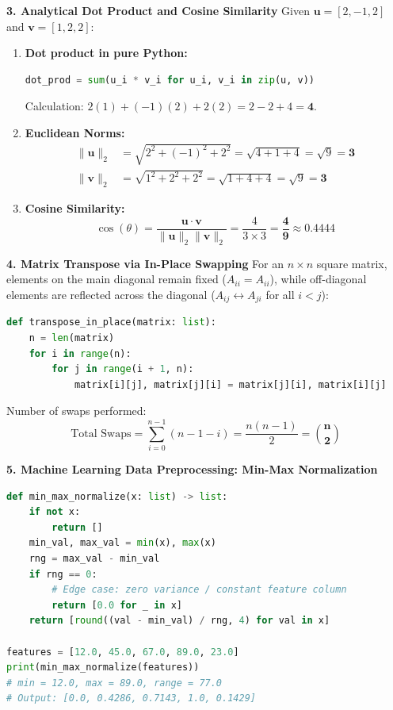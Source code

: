 \textbf{3. Analytical Dot Product and Cosine Similarity}
Given $\mathbf{u} = [2, -1, 2]$ and $\mathbf{v} = [1, 2, 2]$:
\begin{enumerate}
    \item \textbf{Dot product in pure Python:}
    \begin{lstlisting}[language=Python]
    dot_prod = sum(u_i * v_i for u_i, v_i in zip(u, v))
    \end{lstlisting}
    Calculation: $2(1) + (-1)(2) + 2(2) = 2 - 2 + 4 = \mathbf{4}$.
    \item \textbf{Euclidean Norms:}
    \begin{align*}
    \|\mathbf{u}\|_2 &= \sqrt{2^2 + (-1)^2 + 2^2} = \sqrt{4 + 1 + 4} = \sqrt{9} = \mathbf{3} \\
    \|\mathbf{v}\|_2 &= \sqrt{1^2 + 2^2 + 2^2} = \sqrt{1 + 4 + 4} = \sqrt{9} = \mathbf{3}
    \end{align*}
    \item \textbf{Cosine Similarity:}
    \begin{equation*}
    \cos(\theta) = \frac{\mathbf{u} \cdot \mathbf{v}}{\|\mathbf{u}\|_2 \|\mathbf{v}\|_2} = \frac{4}{3 \times 3} = \mathbf{\frac{4}{9}} \approx \mathbf{0.4444}
    \end{equation*}
\end{enumerate}

\textbf{4. Matrix Transpose via In-Place Swapping}
For an $n \times n$ square matrix, elements on the main diagonal remain fixed ($A_{ii} = A_{ii}$), while off-diagonal elements are reflected across the diagonal ($A_{ij} \leftrightarrow A_{ji}$ for all $i < j$):
\begin{lstlisting}[language=Python]
def transpose_in_place(matrix: list):
    n = len(matrix)
    for i in range(n):
        for j in range(i + 1, n):
            matrix[i][j], matrix[j][i] = matrix[j][i], matrix[i][j]
\end{lstlisting}
Number of swaps performed:
\begin{equation*}
\text{Total Swaps} = \sum_{i=0}^{n-1} (n - 1 - i) = \frac{n(n - 1)}{2} = \mathbf{\binom{n}{2}}
\end{equation*}

\textbf{5. Machine Learning Data Preprocessing: Min-Max Normalization}
\begin{lstlisting}[language=Python]
def min_max_normalize(x: list) -> list:
    if not x:
        return []
    min_val, max_val = min(x), max(x)
    rng = max_val - min_val
    if rng == 0:
        # Edge case: zero variance / constant feature column
        return [0.0 for _ in x]
    return [round((val - min_val) / rng, 4) for val in x]

features = [12.0, 45.0, 67.0, 89.0, 23.0]
print(min_max_normalize(features))
# min = 12.0, max = 89.0, range = 77.0
# Output: [0.0, 0.4286, 0.7143, 1.0, 0.1429]
\end{lstlisting}

